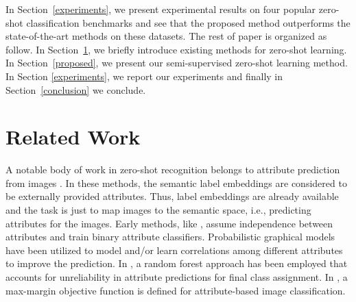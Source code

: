 \documentclass[letterpaper]{article}
\begin{document}
In Section~\ref{experiments}, we present experimental results on four popular zero-shot classification benchmarks
 and see that the proposed method outperforms the state-of-the-art methods on these datasets.
The rest of paper is organized as follow. In Section~\ref{related}, we briefly introduce existing methods for zero-shot learning.
In Section~\ref{proposed}, we present our semi-supervised zero-shot learning method. In Section \ref{experiments}, we report our experiments and finally in Section~\ref{conclusion}
we conclude.

\section{Related Work} \label{related}

A notable body of work in zero-shot recognition belongs to attribute prediction from images \cite{lampert09,topicmodel,ajoint11,unified13,suzuki14}.
In these methods, the semantic label embeddings are considered to be externally provided attributes. Thus, label embeddings are already available
 and the task is just to map images to the semantic space, i.e., predicting attributes for the images.
Early methods, like \cite{lampert09}, assume independence between attributes and train binary attribute classifiers.
Probabilistic graphical models have been utilized to model and/or learn correlations among different attributes \cite{topicmodel,unified13}
 to improve the prediction.
In \cite{jayaraman14}, a random forest approach has been employed that accounts for unreliability in attribute predictions for final class assignment.
In \cite{Akata2015pami}, a max-margin objective function
is defined for attribute-based image classification.
\end{document}
